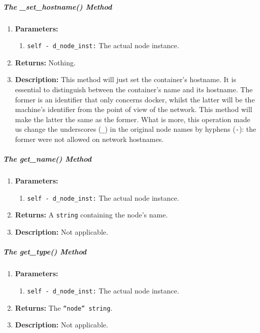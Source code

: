         \subparagraph{The \_set\_hostname() Method}
            \begin{enumerate}
                \item \textbf{Parameters:}
                \begin{enumerate}
                    \item \texttt{self - d\_node\_inst:} The actual node instance.
                \end{enumerate}
                \item \textbf{Returns:} Nothing.
                \item \textbf{Description:} This method will just set the container's hostname. It is essential to distinguish between the container's name and its hostname. The former is an identifier that only concerns docker, whilst the latter will be the machine's identifier from the point of view of the network. This method will make the latter the same as the former. What is more, this operation made us change the underscores (\texttt{\_}) in the original node names by hyphens (\texttt{-}): the former were not allowed on network hostnames.
            \end{enumerate}

        \subparagraph{The get\_name() Method}
            \begin{enumerate}
                \item \textbf{Parameters:}
                \begin{enumerate}
                    \item \texttt{self - d\_node\_inst:} The actual node instance.
                \end{enumerate}
                \item \textbf{Returns:} A \texttt{string} containing the node's name.
                \item \textbf{Description:} Not applicable.
            \end{enumerate}

        \subparagraph{The get\_type() Method}
            \begin{enumerate}
                \item \textbf{Parameters:}
                \begin{enumerate}
                    \item \texttt{self - d\_node\_inst:} The actual node instance.
                \end{enumerate}
                \item \textbf{Returns:} The \texttt{``node'' string}.
                \item \textbf{Description:} Not applicable.
            \end{enumerate}

